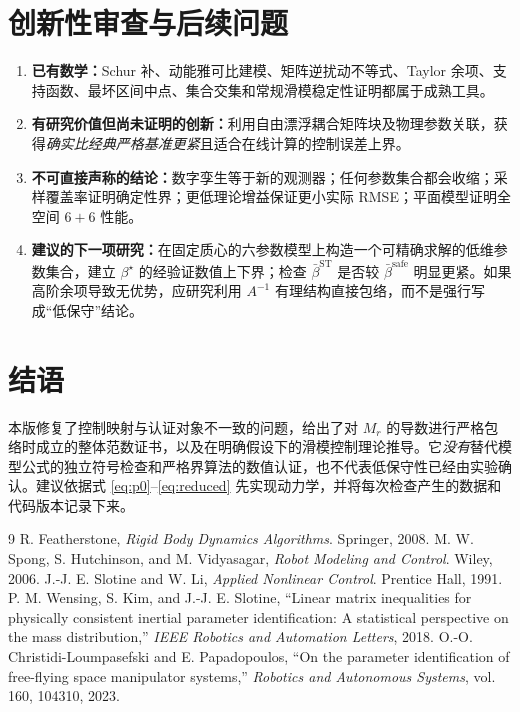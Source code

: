 \documentclass[journal,onecolumn]{IEEEtran}
\begin{document}
\section{创新性审查与后续问题}
\begin{enumerate}[leftmargin=2em]
\item \textbf{已有数学：}Schur 补、动能雅可比建模、矩阵逆扰动不等式、Taylor 余项、支持函数、最坏区间中点、集合交集和常规滑模稳定性证明都属于成熟工具。
\item \textbf{有研究价值但尚未证明的创新：}利用自由漂浮耦合矩阵块及物理参数关联，获得\emph{确实比经典严格基准更紧}且适合在线计算的控制误差上界。
\item \textbf{不可直接声称的结论：}数字孪生等于新的观测器；任何参数集合都会收缩；采样覆盖率证明确定性界；更低理论增益保证更小实际 RMSE；平面模型证明全空间 $6+6$ 性能。
\item \textbf{建议的下一项研究：}在固定质心的六参数模型上构造一个可精确求解的低维参数集合，建立 $\beta^\star$ 的经验证数值上下界；检查 $\bar\beta^{\mathrm{ST}}$ 是否较 $\bar\beta^{\mathrm{safe}}$ 明显更紧。如果高阶余项导致无优势，应研究利用 $A^{-1}$ 有理结构直接包络，而不是强行写成“低保守”结论。
\end{enumerate}

\section*{结语}
本版修复了控制映射与认证对象不一致的问题，给出了对 $M_r$ 的导数进行严格包络时成立的整体范数证书，以及在明确假设下的滑模控制理论推导。它\emph{没有}替代模型公式的独立符号检查和严格界算法的数值认证，也不代表低保守性已经由实验确认。建议依据式 \eqref{eq:p0}--\eqref{eq:reduced} 先实现动力学，并将每次检查产生的数据和代码版本记录下来。

\begin{thebibliography}{9}
 R. Featherstone, \emph{Rigid Body Dynamics Algorithms}. Springer, 2008.
 M. W. Spong, S. Hutchinson, and M. Vidyasagar, \emph{Robot Modeling and Control}. Wiley, 2006.
 J.-J. E. Slotine and W. Li, \emph{Applied Nonlinear Control}. Prentice Hall, 1991.
 P. M. Wensing, S. Kim, and J.-J. E. Slotine, ``Linear matrix inequalities for physically consistent inertial parameter identification: A statistical perspective on the mass distribution,'' \emph{IEEE Robotics and Automation Letters}, 2018.
 O.-O. Christidi-Loumpasefski and E. Papadopoulos, ``On the parameter identification of free-flying space manipulator systems,'' \emph{Robotics and Autonomous Systems}, vol. 160, 104310, 2023.
\end{thebibliography}
\end{document}
